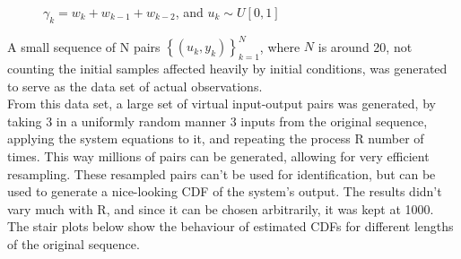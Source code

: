 \begin{figure}[h!]
    \begin{center}
\caption{$\gamma_k = w_k + w_{k-1} + w_{k-2}$, and $u_k \sim U[0,1]$}
\label{}
\end{center}
\end{figure}

A small sequence of N pairs $\left\{ \left( u_k,y_k \right) \right\}^{N}_{k=1}$, where $N$ is around 20, not counting the initial samples affected heavily by initial conditions, was generated to serve as the data set of actual observations.\\
From this data set, a large set of virtual input-output pairs was generated, by taking 3 in a uniformly random manner 3 inputs from the original sequence, applying the system equations to it, and repeating the process R number of times. This way millions of pairs can be generated, allowing for very efficient resampling. These resampled pairs can't be used for identification, but can be used to generate a nice-looking CDF of the system's output.
The results didn't vary much with R, and since it can be chosen arbitrarily, it was kept at 1000. The stair plots below show the behaviour of estimated CDFs for different lengths of the original sequence.

\clearpage

